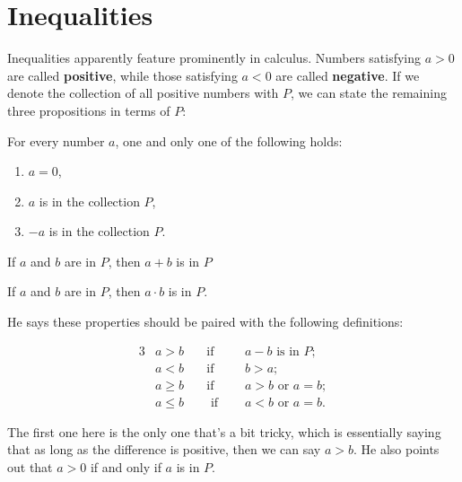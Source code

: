\section{Inequalities}

Inequalities apparently feature prominently in calculus. Numbers satisfying $a > 0$ are
called \textbf{positive}, while those satisfying $a < 0$ are called \textbf{negative}. If
we denote the collection of all positive numbers with $P$, we can state the remaining
three propositions in terms of $P$:

\begin{property}\label{prop:trichotomy}
    For every number $a$, one and only one of the following holds:
    \begin{enumerate}[label=(\roman*), leftmargin = 3em]
        \item $a = 0$,
        \item $a$ is in the collection $P$,
        \item $-a$ is in the collection $P$.
    \end{enumerate}
\end{property}

\begin{property}\label{prop:addclosure}
    If $a$ and $b$ are in $P$, then $a + b$ is in $P$
\end{property}

\begin{property}\label{prop:multclosure}
    If $a$ and $b$ are in $P$, then $a \cdot b$ is in $P$.
\end{property}


He says these properties should be paired with the following definitions:

\begin{alignat*}{3}
    &a > b \quad & \text{if} \quad & a - b \text{ is in } P;\\
    & a < b \quad & \text{if} \quad & b>a;\\
    & a \geq b \quad & \text{if} \quad & a > b \text{ or } a = b; \\
    & a \leq b \quad & \text{ if } \quad & a < b \text{ or } a = b.
\end{alignat*}

The first one here is the only one that's a bit tricky, which is essentially saying that
as long as the difference is positive, then we can say $a > b$. He also points out that $a
> 0$ if and only if $a$ is in $P$.

